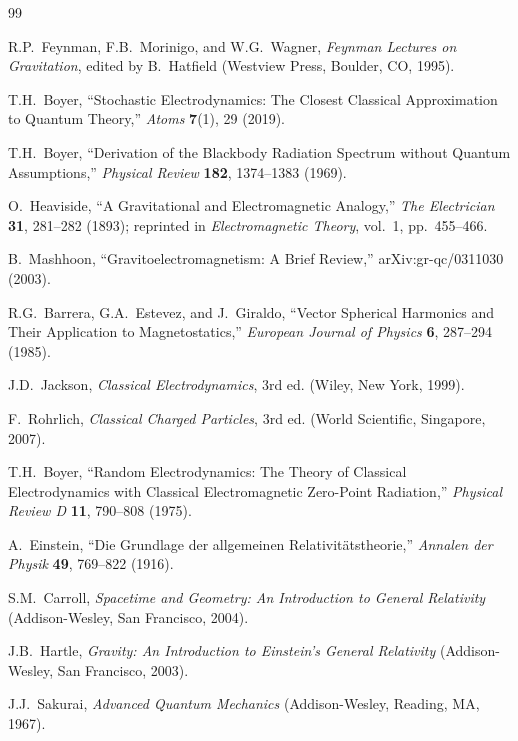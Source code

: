 \documentclass {article}
\begin{document}
\begin{thebibliography}{99}
	
	R.P.~Feynman, F.B.~Morinigo, and W.G.~Wagner,
	\textit{Feynman Lectures on Gravitation},
	edited by B.~Hatfield
	(Westview Press, Boulder, CO, 1995).
	
	T.H.\ Boyer,
	``Stochastic Electrodynamics: The Closest Classical Approximation to Quantum Theory,''
	\textit{Atoms} \textbf{7}(1), 29 (2019).
	
	T.H.\ Boyer,
	``Derivation of the Blackbody Radiation Spectrum without Quantum Assumptions,''
	\textit{Physical Review} \textbf{182}, 1374--1383 (1969).
	
	O.~Heaviside,
	``A Gravitational and Electromagnetic Analogy,''
	\textit{The Electrician} \textbf{31}, 281--282 (1893);
	reprinted in \textit{Electromagnetic Theory}, vol.~1, pp.~455--466.
		
	B.~Mashhoon,
	``Gravitoelectromagnetism: A Brief Review,''
	arXiv:gr-qc/0311030 (2003).
	
	R.G.~Barrera, G.A.~Estevez, and J.~Giraldo,
	``Vector Spherical Harmonics and Their Application to Magnetostatics,''
	\textit{European Journal of Physics} \textbf{6}, 287--294 (1985).
	
	J.D.~Jackson,
	\textit{Classical Electrodynamics}, 3rd ed.
	(Wiley, New York, 1999).
	
	F.~Rohrlich,
	\textit{Classical Charged Particles}, 3rd ed.
	(World Scientific, Singapore, 2007).
	
	T.H.\ Boyer,
	``Random Electrodynamics: The Theory of Classical Electrodynamics with Classical Electromagnetic Zero-Point Radiation,''
	\textit{Physical Review D} \textbf{11}, 790--808 (1975).
	
	A.~Einstein,
	``Die Grundlage der allgemeinen Relativit\"atstheorie,''
	\textit{Annalen der Physik} \textbf{49}, 769--822 (1916).
	
	S.M.~Carroll,
	\textit{Spacetime and Geometry: An Introduction to General Relativity}
	(Addison-Wesley, San Francisco, 2004).
	
	J.B.~Hartle,
	\textit{Gravity: An Introduction to Einstein's General Relativity}
	(Addison-Wesley, San Francisco, 2003).
	
	J.J.~Sakurai,
	\textit{Advanced Quantum Mechanics}
	(Addison-Wesley, Reading, MA, 1967).
	
\end{thebibliography}
\end{document}
